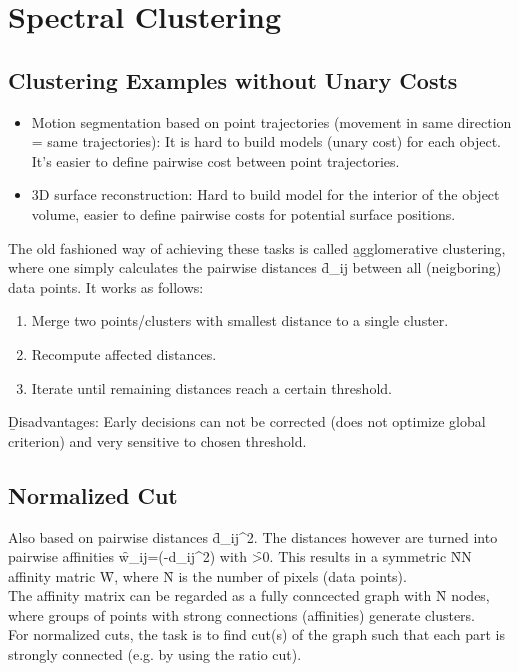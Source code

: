 \section{Spectral Clustering}
\subsection{Clustering Examples without Unary Costs}
\begin{itemize}
    \item Motion segmentation based on point trajectories (movement in same direction = same trajectories): It is hard to build models (unary cost) for each object. It's easier to define pairwise cost between point trajectories.
    \item 3D surface reconstruction: Hard to build model for the interior of the object volume, easier to define pairwise costs for potential surface positions.
\end{itemize}
The old fashioned way of achieving these tasks is called \b{agglomerative clustering}, where one simply calculates the pairwise distances \f{d_{ij}} between all (neigboring) data points. It works as follows:
\begin{enumerate}
    \item Merge two points/clusters with smallest distance to a single cluster.
    \item Recompute affected distances.
    \item Iterate until remaining distances reach a certain threshold.
\end{enumerate}
\b{Disadvantages:} Early decisions can not be corrected (does not optimize global criterion) and very sensitive to chosen threshold.

\subsection{Normalized Cut}
Also based on pairwise distances \f{d_{ij}^2}. The distances however are turned into pairwise affinities \f{w_{ij}=\exp(-\lambda d_{ij}^2)} with \f{\lambda>0}. This results in a symmetric \f{N\times N} affinity matric \f{W}, where \f{N} is the number of pixels (data points).\\
The affinity matrix can be regarded as a fully conncected graph with \f{N} nodes, where groups of points with strong connections (affinities) generate clusters.\\

For normalized cuts, the task is to find cut(s) of the graph such that each part is strongly connected (e.g. by using the ratio cut).\\

